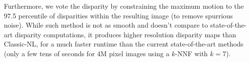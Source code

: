 Furthermore, we vote the disparity by constraining the maximum motion to the 97.5 percentile of disparities within the resulting image (to remove spurrious noise).
While such method is not as smooth and doesn't compare to state-of-the-art disparity computations, it produces higher resolution disparity maps than Classic-NL, for a much faster runtime than the current state-of-the-art methods (only a few tens of seconds for 4M pixel images using a $k$-NNF with $k=7$).